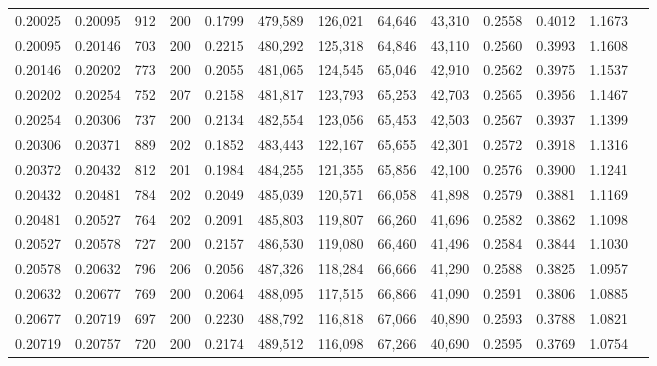 \begin{tabular}{rrrrrrrrrrrrr}
0.20025 & 0.20095 &   912 & 200 &                                     0.1799 & 479,589 & 126,021 &  64,646 &  43,310 & 0.2558 & 0.4012 & 1.1673 \\
0.20095 & 0.20146 &   703 & 200 &                                     0.2215 & 480,292 & 125,318 &  64,846 &  43,110 & 0.2560 & 0.3993 & 1.1608 \\
0.20146 & 0.20202 &   773 & 200 &                                     0.2055 & 481,065 & 124,545 &  65,046 &  42,910 & 0.2562 & 0.3975 & 1.1537 \\
0.20202 & 0.20254 &   752 & 207 &                                     0.2158 & 481,817 & 123,793 &  65,253 &  42,703 & 0.2565 & 0.3956 & 1.1467 \\
0.20254 & 0.20306 &   737 & 200 &                                     0.2134 & 482,554 & 123,056 &  65,453 &  42,503 & 0.2567 & 0.3937 & 1.1399 \\
0.20306 & 0.20371 &   889 & 202 &                                     0.1852 & 483,443 & 122,167 &  65,655 &  42,301 & 0.2572 & 0.3918 & 1.1316 \\
0.20372 & 0.20432 &   812 & 201 &                                     0.1984 & 484,255 & 121,355 &  65,856 &  42,100 & 0.2576 & 0.3900 & 1.1241 \\
0.20432 & 0.20481 &   784 & 202 &                                     0.2049 & 485,039 & 120,571 &  66,058 &  41,898 & 0.2579 & 0.3881 & 1.1169 \\
0.20481 & 0.20527 &   764 & 202 &                                     0.2091 & 485,803 & 119,807 &  66,260 &  41,696 & 0.2582 & 0.3862 & 1.1098 \\
0.20527 & 0.20578 &   727 & 200 &                                     0.2157 & 486,530 & 119,080 &  66,460 &  41,496 & 0.2584 & 0.3844 & 1.1030 \\
0.20578 & 0.20632 &   796 & 206 &                                     0.2056 & 487,326 & 118,284 &  66,666 &  41,290 & 0.2588 & 0.3825 & 1.0957 \\
0.20632 & 0.20677 &   769 & 200 &                                     0.2064 & 488,095 & 117,515 &  66,866 &  41,090 & 0.2591 & 0.3806 & 1.0885 \\
0.20677 & 0.20719 &   697 & 200 &                                     0.2230 & 488,792 & 116,818 &  67,066 &  40,890 & 0.2593 & 0.3788 & 1.0821 \\
0.20719 & 0.20757 &   720 & 200 &                                     0.2174 & 489,512 & 116,098 &  67,266 &  40,690 & 0.2595 & 0.3769 & 1.0754 \\

\end{tabular}
